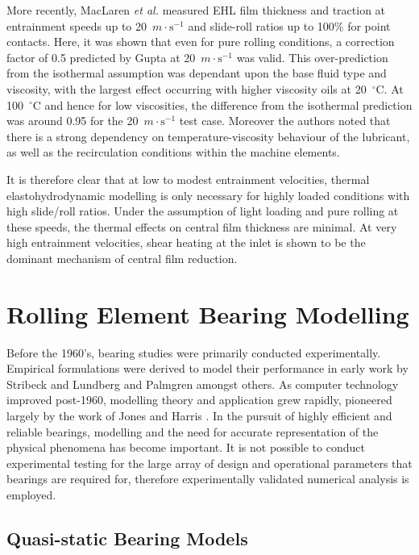 More recently, MacLaren \textit{et al.} \cite{MacLaren2024} measured EHL film thickness and traction at entrainment speeds up to 20~$m\cdot\mathrm{s}^{-1}$ and slide-roll ratios up to 100\% for point contacts. Here, it was shown that even for pure rolling conditions, a correction factor of 0.5 predicted by Gupta at 20~$m\cdot\mathrm{s}^{-1}$ was valid. This over-prediction from the isothermal assumption was dependant upon the base fluid type and viscosity, with the largest effect occurring with higher viscosity oils at 20~${ }^{\circ}\mathrm{C}$. At 100~${ }^{\circ}\mathrm{C}$ and hence for low viscosities, the difference from the isothermal prediction was around 0.95 for the 20~$m\cdot\mathrm{s}^{-1}$ test case. Moreover the authors noted that there is a strong dependency on temperature-viscosity behaviour of the lubricant, as well as the recirculation conditions within the machine elements.

It is therefore clear that at low to modest entrainment velocities, thermal elastohydrodynamic modelling is only necessary for highly loaded conditions with high slide/roll ratios. Under the assumption of light loading and pure rolling at these speeds, the thermal effects on central film thickness are minimal. At very high entrainment velocities, shear heating at the inlet is shown to be the dominant mechanism of central film reduction.

\section{Rolling Element Bearing Modelling}

Before the 1960’s, bearing studies were primarily conducted experimentally. Empirical formulations were derived to model their performance in early work by Stribeck \cite{Stribeck1907} and Lundberg and Palmgren \cite{Lundberg1952} \cite{Palmgren1959} amongst others. As computer technology improved post-1960, modelling theory and application grew rapidly, pioneered largely by the work of Jones \cite{Jones1960} and Harris \cite{Harris1984}. In the pursuit of highly efficient and reliable bearings, modelling and the need for accurate representation of the physical phenomena has become important. It is not possible to conduct experimental testing for the large array of design and operational parameters that bearings are required for, therefore experimentally validated numerical analysis is employed.

\subsection{Quasi-static Bearing Models}

